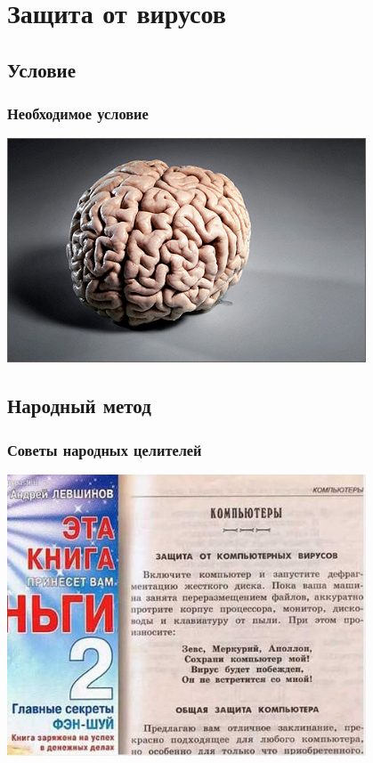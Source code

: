 \documentclass[compress,red]{beamer}
\begin{document}
\section{Защита от вирусов}
\subsection{Условие}
\begin{frame}
  \frametitle{Необходимое условие}
  \centerline{\includegraphics[width=0.8\textwidth]{images/brain.jpg}}
\end{frame}

\subsection{Народный метод}
\begin{frame}
  \frametitle{Советы народных целителей}
  \centerline{\includegraphics[width=0.8\textwidth]{images/magic.jpg}}
\end{frame}
\end{document}
